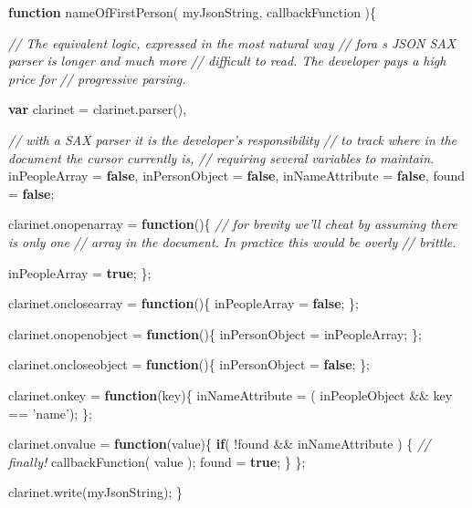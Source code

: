 \documentclass[]{article}
\newenvironment{Shaded}{}{}
\newcommand{\KeywordTok}[1]{\textcolor[rgb]{0.00,0.44,0.13}{\textbf{{#1}}}}
\newcommand{\StringTok}[1]{\textcolor[rgb]{0.25,0.44,0.63}{{#1}}}
\newcommand{\CommentTok}[1]{\textcolor[rgb]{0.38,0.63,0.69}{\textit{{#1}}}}
\newcommand{\OtherTok}[1]{\textcolor[rgb]{0.00,0.44,0.13}{{#1}}}
\newcommand{\FunctionTok}[1]{\textcolor[rgb]{0.02,0.16,0.49}{{#1}}}
\newcommand{\NormalTok}[1]{{#1}}
\begin{document}
\begin{Shaded}
\begin{Highlighting}[]
\KeywordTok{function} \FunctionTok{nameOfFirstPerson}\NormalTok{( myJsonString, callbackFunction )\{}

   \CommentTok{// The equivalent logic, expressed in the most natural way}
   \CommentTok{// fora s JSON SAX parser is longer and much more }
   \CommentTok{// difficult to read. The developer pays a high price for }
   \CommentTok{// progressive parsing. }

   \KeywordTok{var} \NormalTok{clarinet = }\OtherTok{clarinet}\NormalTok{.}\FunctionTok{parser}\NormalTok{(),}
   
       \CommentTok{// with a SAX parser it is the developer's responsibility }
       \CommentTok{// to track where in the document the cursor currently is,}
       \CommentTok{// requiring several variables to maintain.        }
       \NormalTok{inPeopleArray = }\KeywordTok{false}\NormalTok{,   }
       \NormalTok{inPersonObject = }\KeywordTok{false}\NormalTok{,}
       \NormalTok{inNameAttribute = }\KeywordTok{false}\NormalTok{,}
       \NormalTok{found = }\KeywordTok{false}\NormalTok{;}
   
   \OtherTok{clarinet}\NormalTok{.}\FunctionTok{onopenarray} \NormalTok{= }\KeywordTok{function}\NormalTok{()\{}
      \CommentTok{// for brevity we'll cheat by assuming there is only one}
      \CommentTok{// array in the document. In practice this would be overly}
      \CommentTok{// brittle.}
      
      \NormalTok{inPeopleArray = }\KeywordTok{true}\NormalTok{; }
   \NormalTok{\};}
   
   \OtherTok{clarinet}\NormalTok{.}\FunctionTok{onclosearray} \NormalTok{= }\KeywordTok{function}\NormalTok{()\{}
      \NormalTok{inPeopleArray = }\KeywordTok{false}\NormalTok{;}
   \NormalTok{\};   }
   
   \OtherTok{clarinet}\NormalTok{.}\FunctionTok{onopenobject} \NormalTok{= }\KeywordTok{function}\NormalTok{()\{}
      \NormalTok{inPersonObject = inPeopleArray; }
   \NormalTok{\};}
   
   \OtherTok{clarinet}\NormalTok{.}\FunctionTok{oncloseobject} \NormalTok{= }\KeywordTok{function}\NormalTok{()\{}
      \NormalTok{inPersonObject = }\KeywordTok{false}\NormalTok{;}
   \NormalTok{\};   }
      
   \OtherTok{clarinet}\NormalTok{.}\FunctionTok{onkey} \NormalTok{= }\KeywordTok{function}\NormalTok{(key)\{}
      \NormalTok{inNameAttribute = ( inPeopleObject && key == }\StringTok{'name'}\NormalTok{);}
   \NormalTok{\};}

   \OtherTok{clarinet}\NormalTok{.}\FunctionTok{onvalue} \NormalTok{= }\KeywordTok{function}\NormalTok{(value)\{}
      \KeywordTok{if}\NormalTok{( !found && inNameAttribute ) \{}
         \CommentTok{// finally!}
         \FunctionTok{callbackFunction}\NormalTok{( value );}
         \NormalTok{found = }\KeywordTok{true}\NormalTok{;}
      \NormalTok{\}}
   \NormalTok{\};      }
   
   \OtherTok{clarinet}\NormalTok{.}\FunctionTok{write}\NormalTok{(myJsonString);   }
\NormalTok{\}}
\end{Highlighting}
\end{Shaded}
\end{document}
